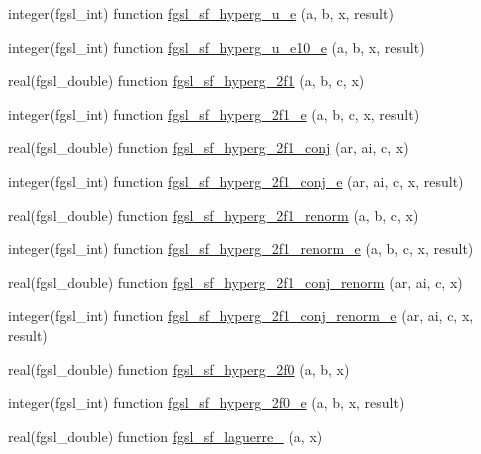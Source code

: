 \begin{DoxyCompactItemize}
integer(fgsl\+\_\+int) function \hyperlink{specfunc_8finc_aca06018149f6691b1145778b57e92a5f}{fgsl\+\_\+sf\+\_\+hyperg\+\_\+u\+\_\+e} (a, b, x, result)
\item 
integer(fgsl\+\_\+int) function \hyperlink{specfunc_8finc_a20c40edefef252ba75ecb8db90c3911d}{fgsl\+\_\+sf\+\_\+hyperg\+\_\+u\+\_\+e10\+\_\+e} (a, b, x, result)
\item 
real(fgsl\+\_\+double) function \hyperlink{specfunc_8finc_ab2fdce3ce4c3c756d86f5923d0051acb}{fgsl\+\_\+sf\+\_\+hyperg\+\_\+2f1} (a, b, c, x)
\item 
integer(fgsl\+\_\+int) function \hyperlink{specfunc_8finc_a6e3a3bc5ee5222671a75e63762558a90}{fgsl\+\_\+sf\+\_\+hyperg\+\_\+2f1\+\_\+e} (a, b, c, x, result)
\item 
real(fgsl\+\_\+double) function \hyperlink{specfunc_8finc_a9252e667b8b8e170248df6de4b007835}{fgsl\+\_\+sf\+\_\+hyperg\+\_\+2f1\+\_\+conj} (ar, ai, c, x)
\item 
integer(fgsl\+\_\+int) function \hyperlink{specfunc_8finc_ae90490f040c7ac25a292a19039b1f984}{fgsl\+\_\+sf\+\_\+hyperg\+\_\+2f1\+\_\+conj\+\_\+e} (ar, ai, c, x, result)
\item 
real(fgsl\+\_\+double) function \hyperlink{specfunc_8finc_ab27b61eccc2ba49afff5f6bc4872345a}{fgsl\+\_\+sf\+\_\+hyperg\+\_\+2f1\+\_\+renorm} (a, b, c, x)
\item 
integer(fgsl\+\_\+int) function \hyperlink{specfunc_8finc_a39eb4a4ce7e1167447fd344643f1e6b7}{fgsl\+\_\+sf\+\_\+hyperg\+\_\+2f1\+\_\+renorm\+\_\+e} (a, b, c, x, result)
\item 
real(fgsl\+\_\+double) function \hyperlink{specfunc_8finc_a311475a4efa7232c466604aa93181538}{fgsl\+\_\+sf\+\_\+hyperg\+\_\+2f1\+\_\+conj\+\_\+renorm} (ar, ai, c, x)
\item 
integer(fgsl\+\_\+int) function \hyperlink{specfunc_8finc_a4c8097d38f25f2b48187eb722c15d4d4}{fgsl\+\_\+sf\+\_\+hyperg\+\_\+2f1\+\_\+conj\+\_\+renorm\+\_\+e} (ar, ai, c, x, result)
\item 
real(fgsl\+\_\+double) function \hyperlink{specfunc_8finc_ae0a22f5a6e016aa56b54c6072b0ef4ff}{fgsl\+\_\+sf\+\_\+hyperg\+\_\+2f0} (a, b, x)
\item 
integer(fgsl\+\_\+int) function \hyperlink{specfunc_8finc_a4ac61401038582cac13f7f368a38bdc3}{fgsl\+\_\+sf\+\_\+hyperg\+\_\+2f0\+\_\+e} (a, b, x, result)
\item 
real(fgsl\+\_\+double) function \hyperlink{specfunc_8finc_a904e27e8ae4ffd91e2b851c13de7e1fe}{fgsl\+\_\+sf\+\_\+laguerre\+\_} (a, x)
\item 

\end{DoxyCompactItemize}
